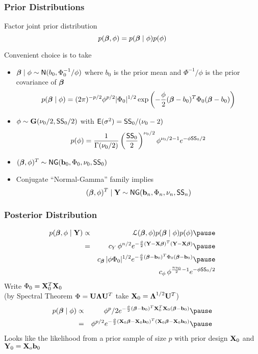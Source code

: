 \documentclass[handout]{beamer}\usepackage[]{graphicx}\usepackage[]{color}
\begin{document}
\begin{frame}
  \frametitle{Prior Distributions}
Factor joint prior distribution  $$p(\boldsymbol{\beta}, \phi) = p(\boldsymbol{\beta} \mid \phi) p(\phi)$$
\pause

Convenient choice is to take \pause
\begin{itemize}
\item $\boldsymbol{\beta} \mid \phi \sim \textsf{N}(b_0, \Phi_0^{-1}/\phi)$ where $b_0$ is the prior
  mean and $\Phi^{-1}/\phi$ is the prior covariance of $\boldsymbol{\beta}$ \pause
 $$ p(\boldsymbol{\beta} \mid \phi) = (2 \pi)^{-p/2} \phi^{p/2} | \Phi_0|^{1/2}
  \exp\left(- \frac{\phi}{2} (\boldsymbol{\beta} - b_0)^T \Phi_0 (\boldsymbol{\beta} - b_0)\right)$$
\item $\phi \sim \mathbf{G}( \nu_0/2, \textsf{SS}_0/2)$  with $\textsf{E}(\sigma^2) =
  \textsf{SS}_0/(\nu_0 - 2)$ \pause
$$p(\phi) = \frac{1}{\Gamma{(\nu_0/2)}}
\left(\frac{\textsf{SS}_0}{2} \right)^{\nu_0/2}
\phi^{\nu_0/2 - 1}
 e^{- \phi \textsf{SS}_0/2}
 $$\pause
\item $(\boldsymbol{\beta}, \phi)^T \sim \textsf{NG}(\mathbf{b}_0, \Phi_0, \nu_0, \textsf{SS}_0)$ \pause
\item Conjugate  ``Normal-Gamma'' family implies \pause
$$(\boldsymbol{\beta}, \phi)^T \mid \mathbf{Y} \sim \textsf{NG}(\mathbf{b}_n, \Phi_n, \nu_n, \textsf{SS}_n)$$
\end{itemize}
\end{frame}
\begin{frame}
  \frametitle{Posterior Distribution}
  \begin{eqnarray*}
     p(\b, \phi \mid \Y) &\propto&  \cL(\b, \phi) p(\b \mid \phi) p(\phi)
    \pause \\
 & = & c_Y\, \phi^{n/2} e^{- \frac \phi 2 (\Y - \X \b)^T (\Y - \X \b)} \pause \\
& & c_{\b}\, |\phi \Phi_0|^{1/2} e^{- \frac{\phi}{2} (\b - \bv_0)^T \Phi_0 (\b - \bv_0) }  \pause \\
& &  c_\phi \, \phi^{\frac{nu_0}{2} - 1} e^{-\phi \SS_0/2}
  \end{eqnarray*}
Write $\Phi_0 = \mathbf{X}_0^T \mathbf{X}_0$ \pause \\(by Spectral Theorem $\Phi = \mathbf{U} \boldsymbol{\Lambda}
\mathbf{U}^T$ take $\mathbf{X}_0 = \boldsymbol{\Lambda}^{1/2} \mathbf{U}^T$)
\pause
\begin{eqnarray*}
p(\b \mid \phi) & \propto & \phi^p/2 e^{- \frac{\phi}{2} (\b - \bv_0)^T
  \X_0^T\X_0 (\b - \bv_0) } \pause \\
 & = & \phi^{p/2} e^{- \frac{\phi}{2} (\X_0\b - \X_0\bv_0)^T
  (\X_0\b - \X_0\bv_0) } \pause
\end{eqnarray*}
Looks like the likelihood from a prior sample of size $p$ with prior
design $\mathbf{X}_0$ and $\mathbf{Y}_0 = \mathbf{X}_o \mathbf{b}_0$

\end{frame}
\end{document}
